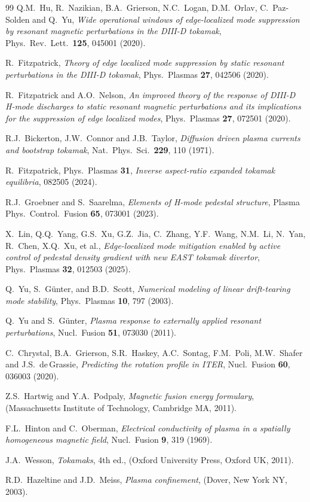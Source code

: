 \documentclass[12pt,prb,aps]{revtex4-1}
\begin{document}
\begin{thebibliography}{99}
  Q.M.~Hu, R.~Nazikian, B.A.~Grierson, N.C.~Logan, D.M.~Orlav, C.~Paz-Solden and Q.~Yu, {\em Wide operational windows
 of edge-localized mode suppression by resonant magnetic perturbations in the DIII-D tokamak}, Phys.\ Rev.\ Lett.\ {\bf 125}, 045001 (2020).
 
 R.~Fitzpatrick, {\em Theory of edge localized mode suppression by static resonant perturbations in the DIII-D tokamak}, Phys.\ Plasmas {\bf 27}, 042506 (2020).

 R.~Fitzpatrick and A.O.~Nelson, 
{\em An improved theory of the response of DIII-D H-mode discharges to static resonant magnetic perturbations and its implications for the suppression of edge localized modes},
Phys.\   Plasmas {\bf 27}, 072501 (2020).

 R.J.~Bickerton, J.W.~Connor and J.B.~Taylor, {\em Diffusion driven plasma currents and bootstrap tokamak}, Nat.\ Phys.\ Sci.\  {\bf 229}, 110 (1971). 

 R.~Fitzpatrick, Phys.\ Plasmas {\bf 31},  {\em Inverse aspect-ratio expanded tokamak equilibria}, 082505 (2024).

 R.J.~Groebner and S.~Saarelma, {\em Elements of H-mode pedestal structure}, Plasma Phys.\ Control.\ Fusion {\bf 65}, 073001 (2023). 

 X.~Lin, Q.Q.~Yang, G.S.~Xu,  G.Z.~Jia, C.~Zhang, Y.F.~Wang,  N.M.~Li, N.~Yan, 
R.~Chen, X.Q.~Xu, et al., {\em Edge-localized mode mitigation enabled by active control of pedestal density gradient with new EAST tokamak divertor}, 
Phys.\ Plasmas {\bf 32}, 012503 (2025).

 Q.~Yu, S.~G\"{u}nter, and B.D.~Scott, {\em Numerical modeling of linear drift-tearing mode stability}, Phys.\ Plasmas {\bf 10}, 797 (2003). 

 Q.~Yu and S.~G\"{u}nter, {\em Plasma response to externally applied resonant perturbations}, Nucl.\ Fusion {\bf 51}, 
073030 (2011).

 C.~Chrystal, B.A.~Grierson, S.R.~Haskey, A.C.~Sontag, F.M.~Poli, M.W.~Shafer and J.S.~de\,Grassie, {\em Predicting the rotation profile in ITER},  Nucl.\ Fusion {\bf 60}, 036003 (2020). 

 Z.S.~Hartwig and Y.A.~Podpaly, {\em Magnetic fusion energy formulary}, (Massachusetts Institute of Technology, Cambridge MA, 2011). 

 F.L.~Hinton and C.~Oberman, {\em Electrical conductivity of plasma in a spatially homogeneous magnetic field}, Nucl.\ Fusion {\bf 9}, 319 (1969). 

  J.A.~Wesson, {\em Tokamaks}, 4th ed., (Oxford University Press, Oxford UK, 2011). 

 R.D.~Hazeltine and J.D.~Meiss, {\em Plasma confinement}, (Dover, New York NY, 2003).

\end{thebibliography}
\end{document}
